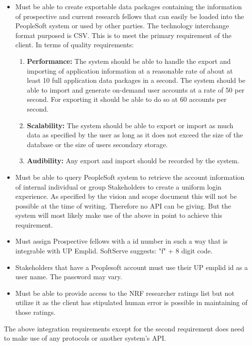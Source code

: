 \documentclass[12pt]{article}
\begin{document}
\begin{itemize}
	\item Must be able to create exportable data packages containing the information of prospective and current research fellows that can easily be loaded into the PeopleSoft system or used by other parties. The technology interchange format purposed is CSV. This is to meet the primary requirement of the client. In terms of quality requirements:
	\begin{enumerate}
		\item \textbf{Performance:} The system should be able to handle the export and importing of application information at a reasonable rate of about at least 10 full application data packages in a second. The system should be able to import and generate on-demand user accounts at a rate of 50 per second. For exporting it should be able to do so at 60 accounts per second.
		\item \textbf{Scalability:} The system should be able to export or import as much data as specified by the user as long as it does not exceed the size of the database or the size of users secondary storage. 
		\item \textbf{Audibility:} Any export and import should be recorded by the system.
	\end{enumerate}  
	\item Must be able to query PeopleSoft system to retrieve the account information of internal individual or group Stakeholders to create a uniform login experience. As specified by the vision and scope document this will not be possible at the time of writing. Therefore no API can be giving. But the system will most likely make use of the above in point to achieve this requirement. 
	\item Must assign Prospective fellows with a id number in such a way that is integrable with UP Emplid. SoftServe suggests: "f" + 8 digit code.
	\item Stakeholders that have a Peoplesoft account must use their UP emplid id as a user name. The password may vary.
	\item Must be able to provide access to the NRF researcher ratings list but not utilize it as the client has stipulated human error is possible in maintaining of those ratings.
\end{itemize}

The above integration requirements except for the second requirement does need to make use of any protocols or another system's API.
\end{document}
